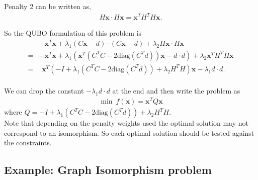 \documentclass{article}
\begin{document}
\noindent Penalty 2 can be written as,
\begin{align*}
    H\mathbf{x} \cdot H\mathbf{x} = \mathbf{x}^T H^T H \mathbf{x}.
\end{align*}

\noindent So the QUBO formulation of this problem is 
\begin{align*}
    &-\mathbf{x}^T \mathbf{x} + \lambda_1(C\mathbf{x} - d)\cdot (C\mathbf{x} - d)  +\lambda_2 H\mathbf{x} \cdot H\mathbf{x}\\
    = &-\mathbf{x}^T \mathbf{x} + \lambda_1(\mathbf{x}^T( C^T C -2\text{diag}(C^T d))\mathbf{x} - d\cdot d) + \lambda_2 \mathbf{x}^T H^T H \mathbf{x}\\
    = &\hspace{5pt} \mathbf{x}^T (-I + \lambda_1( C^T C -2\text{diag}(C^T d)) + 
    \lambda_2 H^T H) \mathbf{x} - \lambda_1 d \cdot d.
\end{align*}\\
We can drop the constant \(- \lambda_1 d \cdot d\) at the end and then write the problem as
\begin{align*}
    \min \: f(\mathbf{x}) = \mathbf{x}^T Q \mathbf{x}
\end{align*}
where \(Q = -I + \lambda_1( C^T C -2\text{diag}(C^T d)) + \lambda_2 H^T H\).\\

\noindent Note that depending on the penalty weights used the optimal solution may not correspond to an isomorphism. So each optimal solution should be tested against the constraints.

\subsection{Example: Graph Isomorphism problem}

\nocite{*}
\printbibliography %
\end{document}
